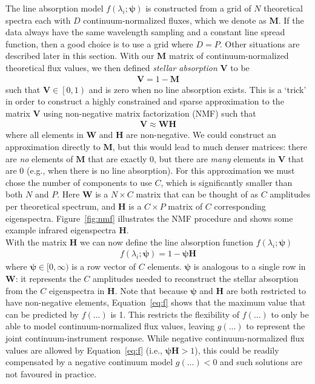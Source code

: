\documentclass[modern]{aastex631}
\renewcommand{\vec}[1]{\mathbf{#1}}
\newcommand{\vecpsi}{\boldsymbol{\psi}}
\newcommand{\vecW}{\mathbf{W}}
\newcommand{\vecH}{\mathbf{H}}
\newcommand{\vecV}{\mathbf{V}}
\begin{document}
The line absorption model $f(\lambda_i;\vecpsi)$ is constructed from a grid of $N$ theoretical spectra each with $D$  continuum-normalized fluxes, which we denote as $\vec{M}$. If the data always have the same wavelength sampling and a constant line spread function, then a good choice is to use a grid where $D = P$. Other situations are described later in this section. With our $\vec{M}$ matrix of continuum-normalized theoretical flux values, we then defined \emph{stellar absorption} $\vecV$ to be
\begin{align}
    \vec{V} = 1 - \vec{M}
\end{align}
such that $\vec{V} \in \left[0, 1\right)$ and is zero when no line absorption exists. This is a `trick' in order to construct a highly constrained and sparse approximation to the matrix $\vecV$ using non-negative matrix factorization (NMF) such that 
\begin{align}
    \vec{V} \approx \vec{W}\vec{H}
\end{align}
where all elements in $\vec{W}$ and $\vec{H}$ are non-negative. 
We could construct an approximation directly to $\vec{M}$, but this would lead to much denser matrices: there are \emph{no} elements of $\vec{M}$ that are exactly 0, but there are \emph{many} elements in $\vec{V}$ that are 0 (e.g., when there is no line absorption).
For this approximation we must chose the number of components to use $C$, which is significantly smaller than both $N$ and $P$. Here $\vec{W}$ is a $N \times C$ matrix that can be thought of as $C$ amplitudes per theoretical spectrum, and $\vec{H}$ is a $C \times P$ matrix of $C$ corresponding eigenspectra. Figure~\ref{fig:nmf} illustrates the NMF procedure and shows some example infrared eigenspectra $\vec{H}$. \\


\noindent{}With the matrix $\vec{H}$ we can now define the line absorption function $f(\lambda_i;\vecpsi)$ 
\begin{align}
    f(\lambda_i;\vecpsi) = 1 - \vecpsi\vecH \label{eq:f}
\end{align}
where $\vecpsi \in [0, \infty)$ is a row vector of $C$ elements. $\vecpsi$ is analogous to a single row in $\vecW$: it represents the $C$ amplitudes needed to reconstruct the stellar absorption from the $C$ eigenspectra in $\vecH$. Note that because $\vecpsi$ and $\vecH$ are both restricted to have non-negative elements, Equation~\ref{eq:f} shows that the maximum value that can be predicted by $f(...)$ is 1. This restricts the flexibility of $f(...)$ to only be able to model continuum-normalized flux values, leaving $g(...)$ to represent the joint continuum-instrument response. While negative continuum-normalized flux values are allowed by Equation~\ref{eq:f} (i.e., $\vecpsi\vecH > 1$), this could be readily compensated by a negative continuum model $g(...) < 0$ and such solutions are not favoured in practice.\\
\end{document}
